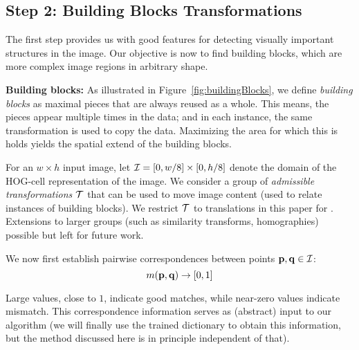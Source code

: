 \documentclass{acmtog}
\begin{document}
\subsection{Step 2: Building Blocks Transformations}
\label{sec:ComputingCooC}

The first step provides us with good features for detecting visually important structures in the image. Our objective is now to find building blocks, which are more complex image regions in arbitrary shape.

\textbf{Building blocks:} As illustrated in Figure~\ref{fig:buildingBlocks}, we define \emph{building blocks} as maximal pieces that are always reused as a whole. This means, the pieces appear multiple times in the data; and in each instance, the same transformation is used to copy the data. Maximizing the area for which this is holds yields the spatial extend of the building blocks.


For an $w \times h$ input image, let $\mathcal{I} = [0,w/8] \times [0, h/8]$ denote the domain of the HOG-cell representation of the image. We consider a group of \emph{admissible transformations} $\mathcal{T}$ that can be used to move image content (used to relate instances of building blocks). We restrict $\mathcal{T}$ to translations in this paper for . Extensions to larger groups (such as similarity transforms, homographies)  possible but left for future work.

We now first establish pairwise correspondences between points $\mathbf{p}, \mathbf{q} \in \mathcal{I}$:
%
\begin{equation}
m(\mathbf{p}, \mathbf{q}) \rightarrow [0,1]
\label{eq:correspondences}
\end{equation}

Large values, close to $1$, indicate good matches, while near-zero values indicate mismatch. This correspondence information serves as (abstract) input to our algorithm (we will finally use the trained dictionary to obtain this information, but the method discussed here is in principle independent of that).
\end{document}
